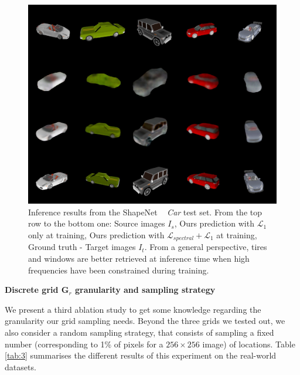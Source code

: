 \begin{figure}[h!]
    \begin{center}
    \includegraphics[width=\textwidth]{images/epipolarnvs/spectralCar.jpg}
    \end{center}
     \caption{Inference results from the ShapeNet ~\cite{chang2015shapenet} \textit{Car} test set. From the top row to the bottom one: Source images  $I_s$, Ours prediction with $\mathcal{L}_{1}$ only at training, Ours prediction with  $\mathcal{L}_{spectral} + \mathcal{L}_{1}$ at training, Ground truth - Target images $I_t$. From a general perspective, tires and windows are better retrieved at inference time when high frequencies have been constrained during training.}
     \label{fig:spectral_res}
\end{figure}

\textbf{Discrete grid $\textbf{G}_{r}$ granularity and sampling strategy}

We present a third ablation study to get some knowledge regarding the granularity our grid sampling needs. Beyond the three grids we tested out, we also consider a random sampling strategy, that consists of sampling a fixed number (corresponding to 1\% of pixels for a $256\times 256$ image) of locations. Table \ref{tab:3} summarises the different results of this experiment on the real-world datasets.

